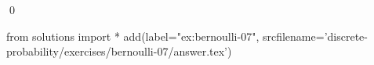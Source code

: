 
\begin{ex} 
  \label{ex:bernoulli-07}
  
  \qed
\end{ex} 
\begin{python0}
from solutions import *
add(label="ex:bernoulli-07",
    srcfilename='discrete-probability/exercises/bernoulli-07/answer.tex') 
\end{python0}
